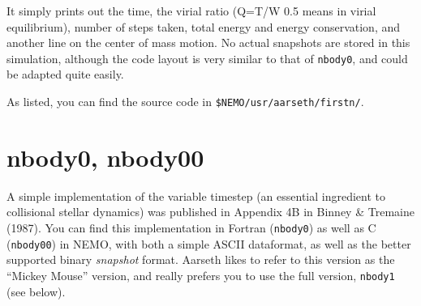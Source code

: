 It simply prints out the time, the virial ratio (Q=T/W 0.5 means in virial
equilibrium), number of steps taken, total energy and energy conservation, and another 
line on the center of mass motion. No actual snapshots are stored in this 
simulation, although the code layout is very similar to that of {\tt nbody0},
and could be adapted quite easily.

As listed, you can find the source code in {\tt \$NEMO/usr/aarseth/firstn/}.

\section{nbody0, nbody00}

A simple implementation of the variable timestep (an essential ingredient
to collisional stellar dynamics) was published in Appendix 4B in
Binney \& Tremaine (1987). 
You can find this implementation in Fortran ({\tt nbody0})
as well as C ({\tt nbody00}) in NEMO, with both a simple ASCII dataformat,
as well as the better supported binary {\it snapshot} format. Aarseth likes
to refer to this version as the ``Mickey Mouse'' version, and really prefers
you to use the full version, {\tt nbody1} (see below).


